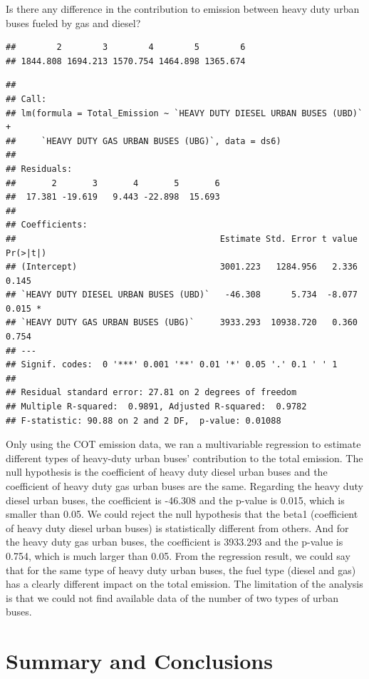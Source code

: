 \documentclass[
  12pt,
]{article}
\begin{document}
Is there any difference in the contribution to emission between heavy
duty urban buses fueled by gas and diesel?

\begin{verbatim}
##        2        3        4        5        6 
## 1844.808 1694.213 1570.754 1464.898 1365.674
\end{verbatim}

\begin{verbatim}
## 
## Call:
## lm(formula = Total_Emission ~ `HEAVY DUTY DIESEL URBAN BUSES (UBD)` + 
##     `HEAVY DUTY GAS URBAN BUSES (UBG)`, data = ds6)
## 
## Residuals:
##       2       3       4       5       6 
##  17.381 -19.619   9.443 -22.898  15.693 
## 
## Coefficients:
##                                        Estimate Std. Error t value Pr(>|t|)  
## (Intercept)                            3001.223   1284.956   2.336    0.145  
## `HEAVY DUTY DIESEL URBAN BUSES (UBD)`   -46.308      5.734  -8.077    0.015 *
## `HEAVY DUTY GAS URBAN BUSES (UBG)`     3933.293  10938.720   0.360    0.754  
## ---
## Signif. codes:  0 '***' 0.001 '**' 0.01 '*' 0.05 '.' 0.1 ' ' 1
## 
## Residual standard error: 27.81 on 2 degrees of freedom
## Multiple R-squared:  0.9891, Adjusted R-squared:  0.9782 
## F-statistic: 90.88 on 2 and 2 DF,  p-value: 0.01088
\end{verbatim}

Only using the COT emission data, we ran a multivariable regression to
estimate different types of heavy-duty urban buses' contribution to the
total emission. The null hypothesis is the coefficient of heavy duty
diesel urban buses and the coefficient of heavy duty gas urban buses are
the same. Regarding the heavy duty diesel urban buses, the coefficient
is -46.308 and the p-value is 0.015, which is smaller than 0.05. We
could reject the null hypothesis that the beta1 (coefficient of heavy
duty diesel urban buses) is statistically different from others. And for
the heavy duty gas urban buses, the coefficient is 3933.293 and the
p-value is 0.754, which is much larger than 0.05. From the regression
result, we could say that for the same type of heavy duty urban buses,
the fuel type (diesel and gas) has a clearly different impact on the
total emission. The limitation of the analysis is that we could not find
available data of the number of two types of urban buses.

\newpage

\hypertarget{summary-and-conclusions}{%
\section{Summary and Conclusions}\label{summary-and-conclusions}}
\end{document}

